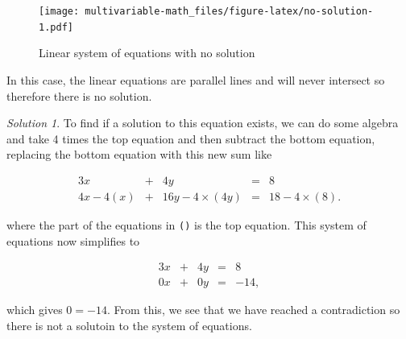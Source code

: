 \documentclass[
]{book}
\newenvironment{Shaded}{\begin{snugshade}}{\end{snugshade}}
\newcommand{\CommentTok}[1]{\textcolor[rgb]{0.56,0.35,0.01}{\textit{#1}}}
\newcommand{\DataTypeTok}[1]{\textcolor[rgb]{0.13,0.29,0.53}{#1}}
\newcommand{\FloatTok}[1]{\textcolor[rgb]{0.00,0.00,0.81}{#1}}
\newcommand{\KeywordTok}[1]{\textcolor[rgb]{0.13,0.29,0.53}{\textbf{#1}}}
\newcommand{\NormalTok}[1]{#1}
\newcommand{\OperatorTok}[1]{\textcolor[rgb]{0.81,0.36,0.00}{\textbf{#1}}}
\newcommand{\StringTok}[1]{\textcolor[rgb]{0.31,0.60,0.02}{#1}}
\theoremstyle{definition}
\theoremstyle{definition}
\theoremstyle{definition}
\theoremstyle{remark}
\newtheorem*{solution}{Solution}
\begin{document}
\begin{Shaded}
\end{Shaded}

\begin{figure}
\centering
\texttt{[image: multivariable-math\_files/figure-latex/no-solution-1.pdf]}
\caption{\label{fig:no-solution}Linear system of equations with no solution}
\end{figure}

In this case, the linear equations are parallel lines and will never intersect so therefore there is no solution.

\begin{solution}

To find if a solution to this equation exists, we can do some algebra and take 4 times the top equation and then subtract the bottom equation, replacing the bottom equation with this new sum like

\begin{alignat*}{3}
x   & {}+{} & 4 y & {}={} & 8 \\
4 x  - 4(x) & {}+{} & 16 y - 4\times (4 y) & {}={} & 18 - 4 \times (8).
\end{alignat*}

where the part of the equations in \texttt{()} is the top equation. This system of equations now simplifies to

\begin{alignat*}{3}
x & {}+{} & 4 y & {}={} & 8 \\
0 x & {}+{} &  0 y & {}={} & -14,
\end{alignat*}

which gives \(0 = -14\). From this, we see that we have reached a contradiction so there is not a solutoin to the system of equations.

\end{solution}
\end{document}
